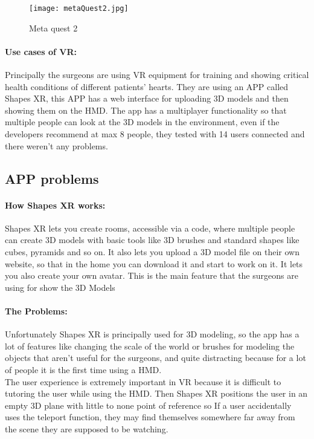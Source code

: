 \begin{figure}[ht]
  \centering
  \texttt{[image: metaQuest2.jpg]}
  \caption{Meta quest 2}
  \label{fig:metaQuest2}
\end{figure}

\paragraph{Use cases of VR:}
Principally the surgeons are using VR equipment for training and showing critical health conditions of different patients' hearts.
They are using an APP called Shapes XR, this APP has a web interface for uploading 3D models and then showing them on the \ac{HMD}.
The app has a multiplayer functionality so that multiple people can look at the 3D models in the environment, even if the developers recommend at max 8 people, they tested with 14 users connected and there weren't any problems.

\subsection{APP problems}

\paragraph{How Shapes XR works:}
Shapes XR lets you create rooms, accessible via a code, where multiple people can create 3D models with basic tools like 3D brushes and standard shapes like cubes, pyramids and so on.
It also lets you upload a 3D model file on their own website, so that in the home you can download it and start to work on it.
It lets you also create your own avatar.
This is the main feature that the surgeons are using for show the 3D Models

\paragraph{The Problems:}
Unfortunately Shapes XR is principally used for 3D modeling, so the app has a lot of features like changing the scale of the world or brushes for modeling the objects that aren't useful for the surgeons,
and quite distracting because for a lot of people it is the first time using a \ac{HMD}.\\
The user experience is extremely important in \ac{VR} because it is difficult to tutoring the user while using the \ac{HMD}.
Then Shapes XR positions the user in an empty 3D plane with little to none point of reference so If a user accidentally uses the teleport function, they may find themselves somewhere far away from the scene they are supposed to be watching.

